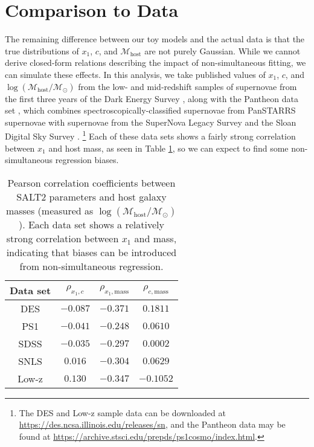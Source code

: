 \section{Comparison to Data}
\label{sec:data_comparison}
The remaining difference between our toy models and the actual data is that the true distributions of $x_1$, $c$, and $\mathcal{M}_\text{host}$ are not purely Gaussian. While we cannot derive closed-form relations describing the impact of non-simultaneous fitting, we can simulate these effects. In this analysis, we take published values of $x_1$, $c$, and $\log(\mathcal{M}_\text{host}/\mathcal{M}_\odot)$ from the low- and mid-redshift samples of supernovae from the first three years of the Dark Energy Survey \cite[][hereafter referred to as the Low-z and DES subsamples]{abbott_first_2019}, along with the Pantheon data set \citep{scolnic_complete_2018}, which combines spectroscopically-classified supernovae from PanSTARRS supernovae \cite[PS1;][]{rest_cosmological_2014, scolnic_color_2014} with supernovae from the SuperNova Legacy Survey \cite[SNLS;][]{conley_supernova_2011, sullivan_snls3_2011} and the Sloan Digital Sky Survey \cite[SDSS;][]{frieman_sloan_2008, kessler_first-year_2009, sako_data_2018}. \footnote{The DES and Low-z sample data can be downloaded at \url{https://des.ncsa.illinois.edu/releases/sn}, and the Pantheon data may be found at \url{https://archive.stsci.edu/prepds/ps1cosmo/index.html}.} Each of these data sets shows a fairly strong correlation between $x_1$ and host mass, as seen in Table \ref{tab:corr_coefs}, so we can expect to find some non-simultaneous regression biases.

\begin{table}[htbp]
    \centering
    \begin{tabular}{cccc}\toprule
        Data set & $\rho_{x_1, c}$ & $\rho_{x_1, \text{mass}}$ & $\rho_{c, \text{mass}}$\\\midrule
        DES & $-0.087$ & $-0.371$ & $0.1811$\\
        PS1 & $-0.041$ & $-0.248$ & $0.0610$\\
        SDSS & $-0.035$ & $-0.297$ & $0.0002$\\
        SNLS & $0.016$ & $-0.304$ & $0.0629$\\
        Low-z & $0.130$ & $-0.347$ & $-0.1052$\\
        \bottomrule
    \end{tabular}
    \caption{Pearson correlation coefficients between SALT2 parameters and host galaxy masses (measured as $\log(\mathcal{M}_\text{host}/\mathcal{M}_\odot)$). Each data set shows a relatively strong correlation between $x_1$ and mass, indicating that biases can be introduced from non-simultaneous regression.}
    \label{tab:corr_coefs}
\end{table}

